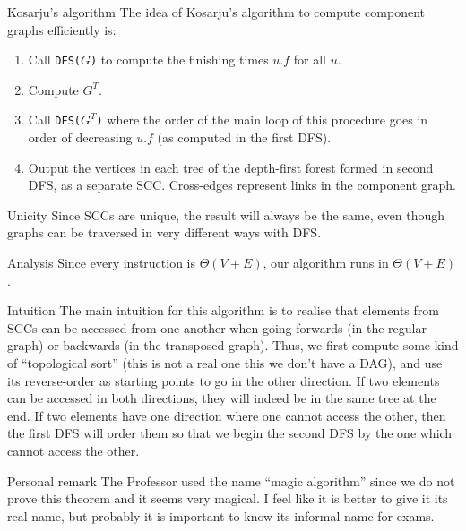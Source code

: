 \documentclass[a4paper]{article}
\begin{document}
\begin{parag}{Kosarju's algorithm}
    The idea of Kosarju's algorithm to compute component graphs efficiently is:
    \begin{enumerate}
        \item Call \texttt{DFS($G$)} to compute the finishing times $u.f$ for all $u$.
        \item Compute $G^T$.
        \item Call \texttt{DFS($G^T$)} where the order of the main loop of this procedure goes in order of decreasing $u.f$ (as computed in the first DFS).
        \item Output the vertices in each tree of the depth-first forest formed in second DFS, as a separate SCC. Cross-edges represent links in the component graph.
    \end{enumerate}
    
    \begin{subparag}{Unicity}
        Since SCCs are unique, the result will always be the same, even though graphs can be traversed in very different ways with DFS.
    \end{subparag}

    \begin{subparag}{Analysis}
        Since every instruction is $\Theta\left(V + E\right)$, our algorithm runs in $\Theta\left(V + E\right)$.
    \end{subparag}
    
    \begin{subparag}{Intuition}
        The main intuition for this algorithm is to realise that elements from SCCs can be accessed from one another when going forwards (in the regular graph) or backwards (in the transposed graph). Thus, we first compute some kind of ``topological sort'' (this is not a real one this we don't have a DAG), and use its reverse-order as starting points to go in the other direction. If two elements can be accessed in both directions, they will indeed be in the same tree at the end. If two elements have one direction where one cannot access the other, then the first DFS will order them so that we begin the second DFS by the one which cannot access the other.
    \end{subparag}

    \begin{subparag}{Personal remark}
        The Professor used the name ``magic algorithm'' since we do not prove this theorem and it seems very magical. I feel like it is better to give it its real name, but probably it is important to know its informal name for exams.
    \end{subparag}
    
\end{parag}
\end{document}
